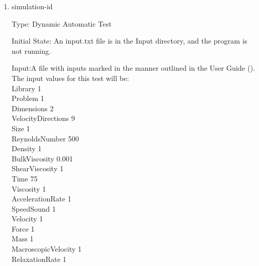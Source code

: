 \documentclass[12pt, titlepage]{article}
\newcommand{\myprogname}{Lattice Boltzmann Solver}
\newcounter{uvtestcounter} %
\begin{document}
\begin{enumerate}
	How test will be performed: 
	\begin{enumerate}
		\item Outside of the system, the input parameter values will be written to a text file titled input.txt, as outlined in Section \ref{ext5-inputs} of the User Guide.
		\item The file will be placed into the Input directory, under the home directory of the project.
		\item M2SystemControl module shall be modified to print the problem parameters and boundary data variable contents.
		\item {\myprogname} shall be run. 
		\item The output values that are printed shall be compared with problem-boundary-data-id1.txt. This can be done by hashing and comparing the contents. We can use hashing for this test since the problem module should return exactly the same contents as the pseudo-oracle. There is no math involved in setting up these parameters, only the structure of the problem data is created.
	\end{enumerate}
	
	\item{simulation-id\theuvtestcounter\\}
	
	Type: Dynamic Automatic Test
	
		Initial State: An input.txt file is in the Input directory, and the program is not running.
	
	Input:A file with inputs marked in the manner outlined in the
	User Guide (\citet{LBM_UserGuide_PM}).\\The input values for this test will
	be:\\
	
	Library 1\\
	Problem 1\\
	Dimensions 2\\
	VelocityDirections 9\\
	Size 1\\
	ReynoldsNumber 500\\
	Density 1\\
	BulkViscosity 0.001\\
	ShearViscosity 1\\
	Time 75\\
	Viscosity 1\\
	AccelerationRate 1\\
	SpeedSound 1\\
	Velocity 1\\
	Force 1\\
	Mass 1\\
	MacroscopicVelocity 1\\
	RelaxationRate 1\\
	

\end{enumerate}
\end{document}
